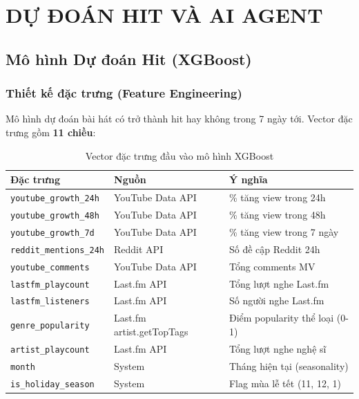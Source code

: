 \documentclass[12pt,a4paper]{report}
\begin{document}
\chapter{DỰ ĐOÁN HIT VÀ AI AGENT}

\section{Mô hình Dự đoán Hit (XGBoost)}

\subsection{Thiết kế đặc trưng (Feature Engineering)}

Mô hình dự đoán bài hát có trở thành hit hay không trong 7 ngày tới. Vector đặc trưng gồm \textbf{11 chiều}:

\begin{table}[H]
\centering
\caption{Vector đặc trưng đầu vào mô hình XGBoost}
\label{tab:features}
\begin{tabular}{|l|l|l|}
\hline
\textbf{Đặc trưng} & \textbf{Nguồn} & \textbf{Ý nghĩa} \\
\hline
\texttt{youtube\_growth\_24h} & YouTube Data API & \% tăng view trong 24h \\
\texttt{youtube\_growth\_48h} & YouTube Data API & \% tăng view trong 48h \\
\texttt{youtube\_growth\_7d} & YouTube Data API & \% tăng view trong 7 ngày \\
\texttt{reddit\_mentions\_24h} & Reddit API & Số đề cập Reddit 24h \\
\texttt{youtube\_comments} & YouTube Data API & Tổng comments MV \\
\texttt{lastfm\_playcount} & Last.fm API & Tổng lượt nghe Last.fm \\
\texttt{lastfm\_listeners} & Last.fm API & Số người nghe Last.fm \\
\texttt{genre\_popularity} & Last.fm artist.getTopTags & Điểm popularity thể loại (0-1) \\
\texttt{artist\_playcount} & Last.fm API & Tổng lượt nghe nghệ sĩ \\
\texttt{month} & System & Tháng hiện tại (seasonality) \\
\texttt{is\_holiday\_season} & System & Flag mùa lễ tết (11, 12, 1) \\
\hline
\end{tabular}
\end{table}
\end{document}
